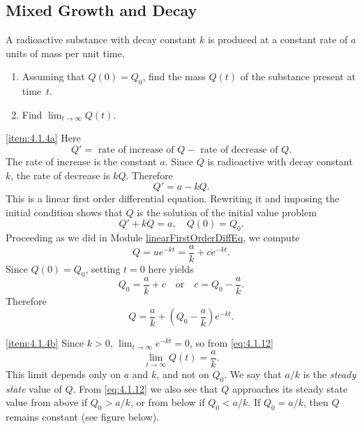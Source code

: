 \documentclass{ximera}
\begin{document}
\subsection*{Mixed Growth and Decay}

\begin{example}\label{example:4.1.4}
A radioactive substance with decay constant $k$ is produced at a
constant rate of $a$ units of mass per unit time.
\begin{enumerate}
\item \label{item:4.1.4a}%
Assuming that $Q(0)=Q_0$, find the mass $Q(t)$ of the
substance present at time~$t$.

\item \label{item:4.1.4b}%
Find $\lim_{t\rightarrow\infty} Q(t)$.
\end{enumerate}
\begin{explanation}
\ref{item:4.1.4a}  Here
$$
Q'=\mbox{ rate of increase of } Q - \mbox{ rate of decrease
of } Q.
$$
The rate of increase is the constant $a$. Since $Q$ is radioactive
with decay constant $k$, the rate of decrease is $kQ$. Therefore
$$
Q'=a-kQ.
$$
This is a linear first order differential equation. Rewriting it and
imposing the initial condition shows that $Q$ is the solution of the
initial value problem
\begin{equation}  \label{eq:4.1.11}
Q'+kQ=a, \quad Q(0)=Q_0.
\end{equation}
Proceeding as we did in Module \href{https://ximera.osu.edu/ode/main/linearFirstOrderDiffEq/linearFirstOrderDiffEq}{linearFirstOrderDiffEq}, we compute $$Q=ue^{-kt}=\frac{a}{k}+ce^{-kt}.$$
 Since $Q(0)=Q_0$, setting $t=0$ here yields
$$Q_0=\frac{a}{k}+c  \quad\mbox{or}\quad c=Q_0-\frac{a}{k}.$$
 Therefore
\begin{equation} \label{eq:4.1.12}
Q=\frac{a}{k}+\left(Q_0-\frac{a}{k}\right)e^{-kt}.
\end{equation}

\ref{item:4.1.4b}
Since $k > 0$,  $\lim_{t\rightarrow\infty} e^{-kt}=0$, so
from \eqref{eq:4.1.12}
$$
\lim_{t\rightarrow\infty} Q(t)=\frac{a}{k}.
$$
This limit depends only on $a$ and $k$, and not on $Q_0$.
We say that $a/k$ is the \textit{steady state} value of $Q$. From
\eqref{eq:4.1.12} we also see that $Q$ approaches its steady state value
from above if $Q_0 > a/k$, or from below if $Q_0 < a/k$. If $Q_0=a/k$,
then $Q$ remains constant (see figure below).

\begin{center}
\end{center}


\end{explanation}
\end{example}
\end{document}
